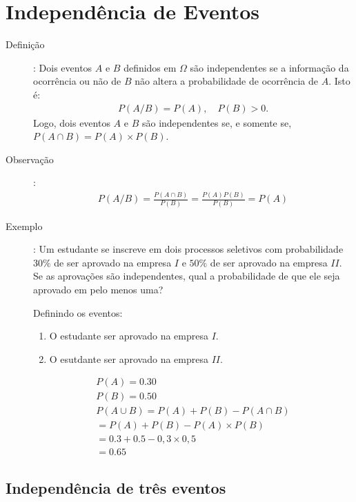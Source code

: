 \begin{description}
\begin{description}
  \end{description}
  \section{Independência de Eventos}

  \begin{description}
    \item [Definição]: Dois eventos $A$ e $B$ definidos em $\Omega$ são independentes se 
      a informação da ocorrência ou não de $B$ não altera a probabilidade de ocorrência
      de $A$. Isto é:
      \begin{align}
        P(A/B)= P(A), \quad        P(B)>0.
      \end{align}
      Logo, dois eventos $A$ e $B$ são independentes se, e somente se, $P(A \cap B)=P(A)\times P(B)$.
    \item [Observação]: 
      \begin{align*}
        P(A/B) = \frac{P(A \cap B)}{P(B)} = \frac{P(A)P(B)}{P(B)}= P(A)
      \end{align*}
    \item [Exemplo]: Um estudante se inscreve em dois processos seletivos com probabilidade 
      $30\%$ de ser aprovado na empresa $I$ e $50\%$ de ser aprovado na empresa $II$. Se 
      as aprovações são independentes, qual a probabilidade de que ele seja aprovado em
      pelo menos uma?

      Definindo os eventos:

      \begin{enumerate}[label=\Alph*:]
        \item  O estudante ser aprovado na empresa $I$.
        \item  O esutdante ser aprovado na empresa $II$.
      \end{enumerate}
      \begin{align*}
        P(A)= 0.30\\
        P(B)=0.50\\
        P(A\cup B)= P(A)+P(B)-P(A\cap B)\\
        =P(A)+P(B)-P(A)\times P(B)\\
        =0.3+0.5- 0,3 \times 0,5\\
        =0.65
      \end{align*}
  \end{description}
  \subsection{Independência de três eventos}


\end{description}
